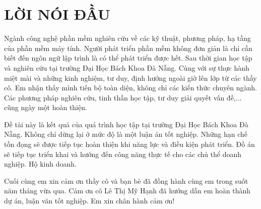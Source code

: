 \documentclass[11pt]{report}
\begin{document}
\pagebreak




\setcounter{page}{1}

\chapter*{LỜI NÓI ĐẦU}
\justifying
\fontsize{13px}{17px}\selectfont


Ngành công nghệ phần mềm nghiên cứu về các kỹ thuật, phương pháp, hạ tầng của phần mềm máy tính. Người phát triển phần mềm không đơn giản là chỉ cần biết đến ngôn ngữ lập trình là có thể phát triển được hết. Sau thời gian học tập và nghiên cứu tại trường Đại Học Bách Khoa Đà Nẵng. Cùng với sự thực hành miệt mài và những kinh nghiệm, tư duy, định hướng ngoài giờ lên lớp từ các thầy cô. Em nhận thấy mình tiến bộ toàn diện, không chỉ các kiến thức chuyên ngành. Các phương pháp nghiên cứu, tinh thần học tập, tư duy giải quyết vấn đề,... cũng ngày một hoàn thiện.


Đề tài này là kết quả của quá trình học tập tại trường Đại Học Bách Khoa Đà Nẵng. Không chỉ dừng lại ở mức độ là một luận án tốt nghiệp. Những hạn chế tồn đọng sẽ được tiếp tục hoàn thiện khi năng lực và điều kiện phát triển. Đồ án sẽ tiếp tục triển khai và hướng đến công năng thực tế cho các chủ thể doanh nghiệp. Hộ kinh doanh.

Cuối cùng em xin cảm ơn thầy cô và bạn bè đã đồng hành cùng em trong suốt năm tháng vừa qua. Cảm ơn cô Lê Thị Mỹ Hạnh đã hướng dẫn em hoàn thành dự án, luận văn tốt nghiệp. Em xin chân hành cảm ơn!
\end{document}
